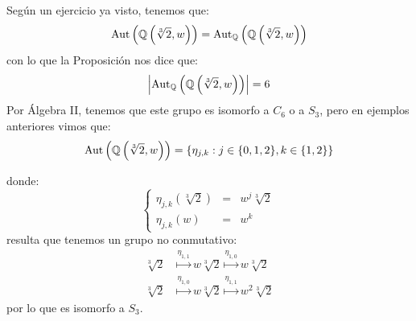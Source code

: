 \begin{ejemplo}
    Según un ejercicio ya visto, tenemos que:
    \begin{equation*}
        \operatorname{Aut}\left(\mathbb{Q}\left(\sqrt[3]{2}, w\right)\right) = \operatorname{Aut}_\mathbb{Q}\left(\mathbb{Q}\left(\sqrt[3]{2}, w\right)\right)
    \end{equation*}
    con lo que la Proposición nos dice que:
    \begin{equation*}
        \left|\operatorname{Aut}_\mathbb{Q}\left(\mathbb{Q}\left(\sqrt[3]{2},w\right)\right)\right| = 6
    \end{equation*}
    Por Álgebra II, tenemos que este grupo es isomorfo a $C_6$ o a $S_3$, pero en ejemplos anteriores vimos que:
    \begin{equation*}
        \operatorname{Aut}\left(\mathbb{Q}\left(\sqrt[3]{2},w\right)\right) = \{\eta_{j,k} : j \in \{0,1,2\}, k\in \{1,2\}\}
    \end{equation*}

    donde:
    \begin{equation*}
        \left\{\begin{array}{ccl}
                \eta_{j,k}\left(\sqrt[3]{2}\right) &=& w^j\sqrt[3]{2} \\
                \eta_{j,k}(w) &=& w^k
        \end{array}\right.
    \end{equation*}
    resulta que tenemos un grupo no conmutativo:
    \begin{align*}
        \sqrt[3]{2} &\stackrel{\eta_{1,1}}{\longmapsto} w\sqrt[3]{2} \stackrel{\eta_{1,0}}{\longmapsto} w\sqrt[3]{2} \\
        \sqrt[3]{2} &\stackrel{\eta_{1,0}}{\longmapsto} w\sqrt[3]{2} \stackrel{\eta_{1,1}}{\longmapsto} w^2\sqrt[3]{2} 
    \end{align*}
    por lo que es isomorfo a $S_3$.
\end{ejemplo}

